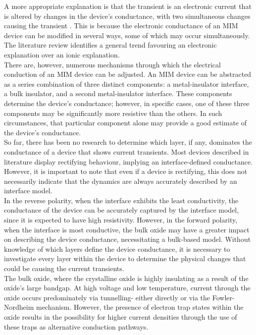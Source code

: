 \noindent A more appropriate explanation is that the transient is an electronic current that is altered by changes in the device's conductance, with two simultaneous changes causing the transient \cite{meyer2005oxygen}. This is because the electronic conductance of an MIM device can be modified in several ways, some of which may occur simultaneously. The literature review identifies a general trend favouring an electronic explanation over an ionic explanation. \\

\noindent There are, however, numerous mechanisms through which the electrical conduction of an MIM device can be adjusted. An MIM device can be abstracted as a series combination of three distinct components: a metal-insulator interface, a bulk insulator, and a second metal-insulator interface. These components determine the device's conductance; however, in specific cases, one of these three components may be significantly more resistive than the others. In such circumstances, that particular component alone may provide a good estimate of the device's conductance. \\

\noindent So far, there has been no research to determine which layer, if any, dominates the conductance of a device that shows current transients. Most devices described in literature display rectifying behaviour, implying an interface-defined conductance. However, it is important to note that even if a device is rectifying, this does not necessarily indicate that the dynamics are always accurately described by an interface model. \\

\noindent In the reverse polarity, when the interface exhibits the least conductivity, the conductance of the device can be accurately captured by the interface model, since it is expected to have high resistivity. However, in the forward polarity, when the interface is most conductive, the bulk oxide may have a greater impact on describing the device conductance, necessitating a bulk-based model. Without knowledge of which layers define the device conductance, it is necessary to investigate every layer within the device to determine the physical changes that could be causing the current transients. \\

\noindent The bulk oxide, where the crystalline oxide is highly insulating as a result of the oxide's large bandgap. At high voltage and low temperature, current through the oxide occurs predominately via tunnelling- either directly or via the Fowler-Nordheim mechanism. However, the presence of electron trap states within the oxide results in the possibility for higher current densities through the use of these traps as alternative conduction pathways. \\

